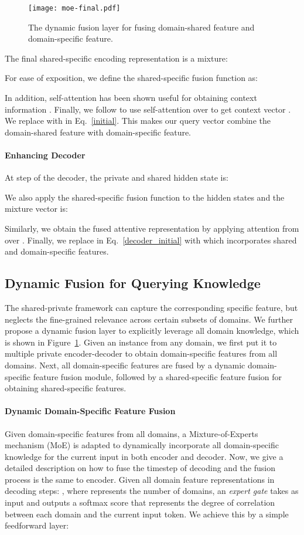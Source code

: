 \documentclass[11pt,a4paper]{article}
\begin{document}
\begin{figure}[t]
	\centering
	\texttt{[image: moe-final.pdf]}
	\caption{
		The dynamic fusion layer for fusing domain-shared feature and domain-specific feature.
	}
	\label{fig:knowledge_transfer}
\end{figure}
The final shared-specific encoding representation  is a mixture:

For ease of exposition, we define the shared-specific fusion function as:

In addition, self-attention has been shown useful for obtaining context information \cite{zhong-etal-2018-global}.
Finally, we follow  to use self-attention over  to get context vector .
We replace  with  in Eq.~\ref{initial}.
This makes our query vector combine the domain-shared feature with domain-specific feature.

\paragraph{Enhancing Decoder}
At  step of the decoder, the private and shared hidden state is:


We also apply the shared-specific fusion function to the hidden states and the mixture vector is:

Similarly, we obtain the fused attentive representation  by applying attention from   over .
Finally, we replace  in Eq.~\ref{decoder_initial} with  which incorporates shared and domain-specific features.

\subsection{Dynamic Fusion for Querying Knowledge} \label{sec:moe}
The shared-private framework can capture the corresponding specific feature, but neglects the fine-grained relevance across certain subsets of domains.
We further propose a dynamic fusion layer to explicitly leverage all domain knowledge, which is shown in Figure~\ref{fig:knowledge_transfer}.
Given an instance from any domain, we first put it to multiple private encoder-decoder to obtain domain-specific features from all domains.
Next, all domain-specific features are fused by a dynamic domain-specific feature fusion module, followed by a shared-specific feature fusion for obtaining shared-specific features.
\paragraph{Dynamic Domain-Specific Feature Fusion}
Given domain-specific features from all domains, a Mixture-of-Experts mechanism (MoE) \cite{guo-etal-2018-multi} is adapted to dynamically incorporate all domain-specific knowledge for the current input in both encoder and decoder. 
Now, we give a detailed description on how to fuse the timestep  of decoding and the fusion process is the same to encoder.
Given all domain feature representations in  decoding steps: , where  represents the number of domains,
an \emph{expert gate}  takes  as input and outputs a softmax score  that represents the degree of correlation between each domain and the current input token.
We achieve this by a simple feedforward layer:
\end{document}
